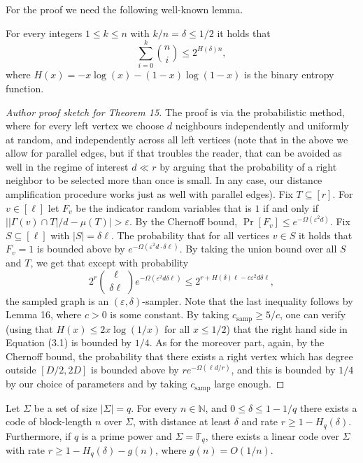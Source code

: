 For the proof we need the following well-known lemma.
\begin{ntlemma}
For every integers $1\leq k\leq n$ with $k/n=\delta\leq1/2$ it holds that
\[\sum_{i=0}^k\binom ni\leq2^{H(\delta)n},\]
where $H(x)=-x\log(x)-(1-x)\log(1-x)$ is the binary entropy function.
\end{ntlemma}
\begin{proof}[Author proof sketch for Theorem 15]
The proof is via the probabilistic method, where for every left vertex we choose $d$ neighbours independently and uniformly at random, and independently across all left vertices (note that in the above we allow for parallel edges, but if that troubles the reader, that can be avoided as well in the regime of interest $d\ll r$ by arguing that the probability of a right neighbor to be selected more than once is small. In any case, our distance amplification procedure works just as well with parallel edges). Fix $T\subseteq[r]$. For $v\in[\ell]$ let $F_v$ be the indicator random variables that is $1$ if and only if $\bigl||\Gamma(v)\cap T|/d-\mu(T)\bigr|>\varepsilon$. By the Chernoff bound, $\Pr[F_v]\leq e^{-\Omega(\varepsilon^2d)}$. Fix $S\subseteq[\ell]$ with $|S|=\delta\ell$. The probability that for all vertices $v\in S$ it holds that $F_v=1$ is bounded above by $e^{-\Omega(\varepsilon^2d\cdot\delta\ell)}$. By taking the union bound over all $S$ and $T$, we get that except with probability
\begin{equation}2^r\binom\ell{\delta\ell}e^{-\Omega(\varepsilon^2d\delta\ell)}\leq2^{r+H(\delta)\ell-c\varepsilon^2d\delta\ell},\tag{3.1}\end{equation}
the sampled graph is an $(\varepsilon,\delta)$-sampler. Note that the last inequality follows by Lemma 16, where $c>0$ is some constant. By taking $c_{\mathrm{samp}}\geq5/c$, one can verify (using that $H(x)\leq2x\log(1/x)$ for all $x\leq1/2$) that the right hand side in Equation (3.1) is bounded by $1/4$.
As for the moreover part, again, by the Chernoff bound, the probability that there exists a right vertex which has degree outside $[D/2,2D]$ is bounded above by $re^{-\Omega(\ell d/r)}$, and this is bounded by $1/4$ by our choice of parameters and by taking $c_{\mathrm{samp}}$ large enough.
\end{proof}
\setcounter{nttheorem}{17}
\begin{nttheorem}
Let $\Sigma$ be a set of size $|\Sigma|=q$. For every $n\in\mathbb N$, and $0\leq\delta\leq1-1/q$ there exists a code of block-length $n$ over $\Sigma$, with distance at least $\delta$ and rate $r\geq1-H_q(\delta)$. Furthermore, if $q$ is a prime power and $\Sigma=\mathbb F_q$, there exists a linear code over $\Sigma$ with rate $r\geq1-H_q(\delta)-g(n)$, where $g(n)=O(1/n)$.
\end{nttheorem}
